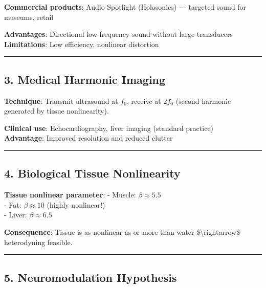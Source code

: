 \textbf{Commercial products}: Audio Spotlight (Holosonics) -\/-\/-
targeted sound for museums, retail

\textbf{Advantages}: Directional low-frequency sound without large
transducers\\
\textbf{Limitations}: Low efficiency, nonlinear distortion

\begin{center}\rule{0.5\linewidth}{0.5pt}\end{center}

\subsection{\texorpdfstring{3. Medical Harmonic Imaging
}{3. Medical Harmonic Imaging }}\label{medical-harmonic-imaging}

\textbf{Technique}: Transmit ultrasound at \(f_0\), receive at \(2f_0\)
(second harmonic generated by tissue nonlinearity).

\textbf{Clinical use}: Echocardiography, liver imaging (standard
practice)\\
\textbf{Advantage}: Improved resolution and reduced clutter

\begin{center}\rule{0.5\linewidth}{0.5pt}\end{center}

\subsection{\texorpdfstring{4. Biological Tissue Nonlinearity
}{4. Biological Tissue Nonlinearity }}\label{biological-tissue-nonlinearity}

\textbf{Tissue nonlinear parameter}: - Muscle: \(\beta \approx 5.5\)\\
- Fat: \(\beta \approx 10\) (highly nonlinear!)\\
- Liver: \(\beta \approx 6.5\)

\textbf{Consequence}: Tissue is as nonlinear as or more than water
\$\textbackslash rightarrow\$ heterodyning feasible.

\begin{center}\rule{0.5\linewidth}{0.5pt}\end{center}

\subsection{\texorpdfstring{5. Neuromodulation Hypothesis
}{5. Neuromodulation Hypothesis }}\label{neuromodulation-hypothesis}

